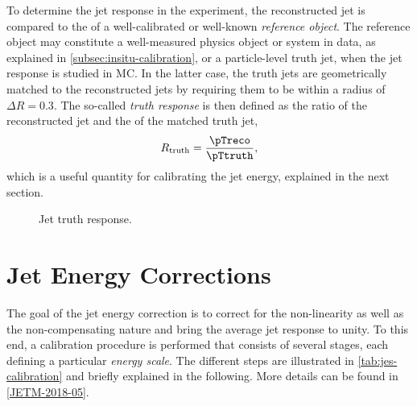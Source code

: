 To determine the jet response in the experiment, the reconstructed jet \pT is compared to the \pT of a well-calibrated or well-known \emph{reference object}. The reference object may constitute a well-measured physics object or system in data, as explained in \cref{subsec:insitu-calibration}, or a particle-level truth jet, when the jet response is studied in MC. 
In the latter case, the truth jets are geometrically matched to the reconstructed jets by requiring them to be within a radius of $\Delta R = 0.3$. 
The so-called \emph{truth response} is then defined as the ratio of the reconstructed jet \pT and the \pT of the matched truth jet,
\begin{equation}
    R_{\text{truth}} =  \frac{\pTreco}{\pTtruth},
\end{equation}
which is a useful quantity for calibrating the jet energy, explained in the next section.

\FloatBarrier
\begin{figure}[t]
    \caption{Jet truth response.}
    \label{fig:truth-response}
\end{figure}


\section{Jet Energy Corrections}
\label{sec:jes-calibration}
The goal of the jet energy correction is to correct for the non-linearity as well as the non-compensating nature and bring the average jet response to unity.
To this end, a calibration procedure is performed that consists of several stages, each defining a particular \emph{energy scale}. The different steps are illustrated in \cref{tab:jes-calibration} and briefly explained in the following. More details can be found in \cref{JETM-2018-05}.

